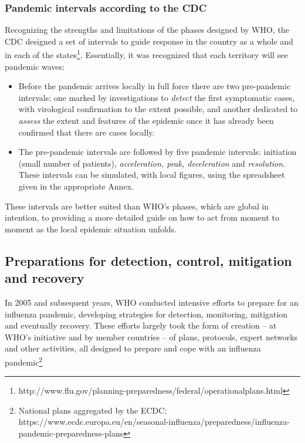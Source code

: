 \documentclass[12pt, a4]{scrartcl}
\begin{document}
\subsubsection{Pandemic intervals according to the CDC}
Recognizing the strengths and limitations of the phases designed by WHO, the CDC designed a set of intervals to guide response in the country as a whole and in each of the states\footnote{http://www.flu.gov/planning-preparedness/federal/operationalplans.html}. Essentially, it was recognized that each territory will see pandemic waves:

\begin{itemize}
	\item Before the pandemic arrives locally in full force there are two pre-pandemic intervals: one marked by investigations to \emph{detect} the first symptomatic cases, with virological confirmation to the extent possible, and another dedicated to \emph{assess} the extent and features of the epidemic once it has already been confirmed that there are cases locally.
	\item The pre-pandemic intervals are followed by five pandemic intervals: initiation (small number of patients), \emph{acceleration, peak, deceleration} and \emph{resolution}. These intervals can be simulated, with local figures, using the spreadsheet given in the appropriate Annex.
\end{itemize}

These intervals are better suited than WHO’s phases, which are global in intention, to providing a more detailed guide on how to act from moment to moment as the local epidemic situation unfolds.

\subsection {Preparations for detection, control, mitigation and recovery}
In 2005 and subsequent years, WHO conducted intensive efforts to prepare for an influenza pandemic, developing strategies for detection, monitoring, mitigation and eventually recovery. These efforts largely took the form of creation – at WHO’s initiative and by member countries – of plans, protocols, expert networks and other activities, all designed to prepare and cope with an influenza pandemic\footnote{National plans aggregated by the ECDC:
https://www.ecdc.europa.eu/en/seasonal-influenza/preparedness/influenza-pandemic-preparedness-plans}
\end{document}
